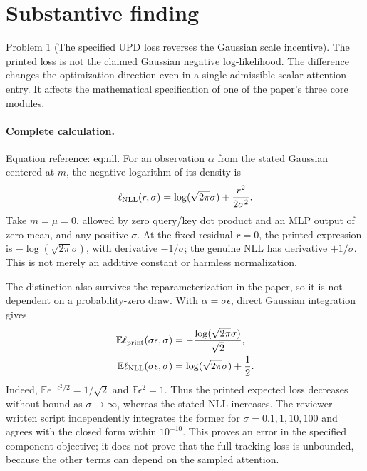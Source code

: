 \documentclass[10pt]{article}
\begin{document}
\section*{Substantive finding}
Problem 1 (The specified UPD loss reverses the Gaussian scale incentive).  The printed loss is not the claimed Gaussian negative log-likelihood. The difference changes the optimization direction even in a single admissible scalar attention entry. It affects the mathematical specification of one of the paper’s three core modules.\par
\paragraph*{Complete calculation.}\mbox{}\par
Equation reference: eq:nll. For an observation \(\alpha\) from the stated Gaussian centered at \(m\), the negative logarithm of its density is \[
 \ell_{\rm NLL}(r,\sigma)=\log(\sqrt{2\pi}\sigma)+\frac{r^2}{2\sigma^2}.\] Take \(m=\mu=0\), allowed by zero query/key dot product and an MLP output of zero mean, and any positive \(\sigma\). At the fixed residual \(r=0\), the printed expression is \(-\log(\sqrt{2\pi}\sigma)\), with derivative \(-1/\sigma\); the genuine NLL has derivative \(+1/\sigma\). This is not merely an additive constant or harmless normalization.\par
The distinction also survives the reparameterization in the paper, so it is not dependent on a probability-zero draw. With \(\alpha=\sigma\epsilon\), direct Gaussian integration gives \[\begin{aligned}
 \mathbb E\ell_{\rm print}(\sigma\epsilon,\sigma)
 &=-\frac{\log(\sqrt{2\pi}\sigma)}{\sqrt2},\\
 \mathbb E\ell_{\rm NLL}(\sigma\epsilon,\sigma)
 &=\log(\sqrt{2\pi}\sigma)+\frac12.\end{aligned}\] Indeed, \(\mathbb E e^{-\epsilon^2/2}=1/\sqrt2\) and \(\mathbb E\epsilon^2=1\). Thus the printed expected loss decreases without bound as \(\sigma\to\infty\), whereas the stated NLL increases. The reviewer-written script independently integrates the former for \(\sigma=0.1,1,10,100\) and agrees with the closed form within \(10^{-10}\). This proves an error in the specified component objective; it does not prove that the full tracking loss is unbounded, because the other terms can depend on the sampled attention.\par
\end{document}
